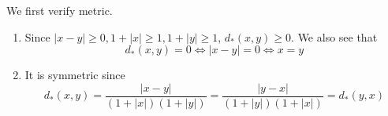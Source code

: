   \begin{solution}
    We first verify metric. 
    \begin{enumerate}
      \item Since $|x - y| \geq 0, 1 + |x| \geq 1, 1 + |y| \geq 1$, $d_\ast (x, y) \geq 0$. We also see that 
      \begin{equation}
        d_\ast (x, y) = 0 \iff |x - y| = 0 \iff x = y
      \end{equation}

      \item It is symmetric since 
      \begin{equation}
        d_\ast (x, y) = \frac{|x - y|}{(1 + |x|)(1 + |y|)} = \frac{|y - x|}{(1 + |y|)(1 + |x|)} = d_\ast (y, x)
      \end{equation}


\end{enumerate}
\end{solution}

